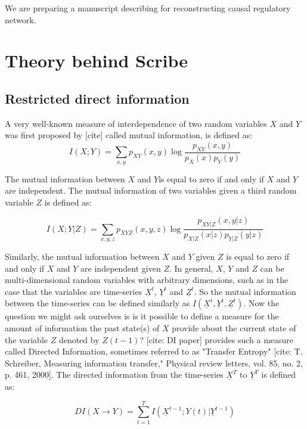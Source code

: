 \documentclass[10pt,oneside]{article}\usepackage[]{graphicx}\usepackage[]{color}
\begin{document}
We are preparing a manuscript describing  for reconstructing causal regulatory network.

\section{Theory behind Scribe}\label{theory}

\subsection{Restricted direct information}\label{RDI}
A very well-known measure of interdependence of two random variables $X$ and $Y$ was first proposed by [cite] called mutual information, is defined as:
\begin{equation}
I(X;Y)=\sum_{x,y} p_{XY}(x,y) \log\frac{p_{XY}(x,y)}{p_X(x)p_Y(y)}
\end{equation}

The mutual information between $X$ and $Y$is equal to zero if and only if $X$ and $Y$ are independent. The mutual information of two variables given a third random variable $Z$ is defined as:

\begin{equation}
I(X;Y|Z)=\sum_{x,y,z} p_{XYZ}(x,y,z) \log\frac{p_{XY|Z}(x,y|z)}{p_{X|Z}(x|z)p_{Y|Z}(y|z)}
\end{equation}

Similarly, the mutual information between $X$ and $Y$ given $Z$ is equal to zero if and only if $X$ and $Y$ are independent given $Z$.
In general, $X$, $Y$ and $Z$ can be multi-dimensional random variables with arbitrary dimensions, such as in the case that the variables are time-series $\underline{X}^t$, $\underline{Y}^t$ and $\underline{Z}^t$. So the mutual information between the time-series can be defined similarly as $ I(\underline{X}^t,\underline{Y}^t,\underline{Z}^t) $.
Now the question we might ask ourselves is is it possible to define a measure for the amount of information the past state(s) of $X$ provide about the current state of the variable $Z$ denoted by $Z(t−1)$? [cite: DI paper] provides such a measure called Directed Information, sometimes referred to as "Transfer Entropy" [cite: T. Schreiber, Measuring information transfer," Physical review letters, vol. 85, no. 2, p. 461, 2000]. The directed information from the time-series $\underline{X}^T$ to $\underline{Y}^T$ is defined as:

\begin{equation}
DI(X\rightarrow Y)=\sum_{t=1}^T I(\underline{X}^{t−1}; Y(t)|\underline{Y}^{t−1})
\end{equation}
\end{document}
